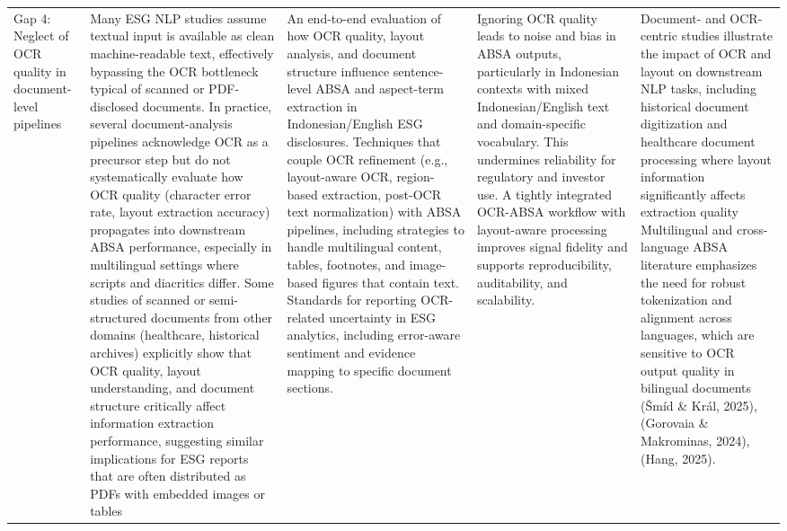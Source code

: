 \begin{landscape}
\begin{longtable}{p{2cm} p{8cm} p{7cm} p{4cm} p{4cm}}
Gap 4: Neglect of OCR quality in document-level pipelines & Many ESG NLP studies assume textual input is available as clean machine-readable text, effectively bypassing the OCR bottleneck typical of scanned or PDF-disclosed documents. In practice, several document-analysis pipelines acknowledge OCR as a precursor step but do not systematically evaluate how OCR quality (character error rate, layout extraction accuracy) propagates into downstream ABSA performance, especially in multilingual settings where scripts and diacritics differ. Some studies of scanned or semi-structured documents from other domains (healthcare, historical archives) explicitly show that OCR quality, layout understanding, and document structure critically affect information extraction performance, suggesting similar implications for ESG reports that are often distributed as PDFs with embedded images or tables \cite{10.1109/icdar.2011.302,10.1093/jamiaopen/ooac045,10.21203/rs.3.rs-6644838/v1,10.3390/app122111063} & An end-to-end evaluation of how OCR quality, layout analysis, and document structure influence sentence-level ABSA and aspect-term extraction in Indonesian/English ESG disclosures. Techniques that couple OCR refinement (e.g., layout-aware OCR, region-based extraction, post-OCR text normalization) with ABSA pipelines, including strategies to handle multilingual content, tables, footnotes, and image-based figures that contain text. Standards for reporting OCR-related uncertainty in ESG analytics, including error-aware sentiment and evidence mapping to specific document sections. & Ignoring OCR quality leads to noise and bias in ABSA outputs, particularly in Indonesian contexts with mixed Indonesian/English text and domain-specific vocabulary. This undermines reliability for regulatory and investor use. A tightly integrated OCR-ABSA workflow with layout-aware processing improves signal fidelity and supports reproducibility, auditability, and scalability. & Document- and OCR-centric studies illustrate the impact of OCR and layout on downstream NLP tasks, including historical document digitization and healthcare document processing where layout information significantly affects extraction quality \cite{10.1108/jd-03-2023-0055,10.1093/jamiaopen/ooac045,10.1109/icdar.2011.302,10.21203/rs.3.rs-6644838/v1,10.1145/3151509.3151525,10.1145/3167132.3167236,10.1145/3322905.3322909} Multilingual and cross-language ABSA literature emphasizes the need for robust tokenization and alignment across languages, which are sensitive to OCR output quality in bilingual documents (Šmíd \& Král, 2025), (Gorovaia \& Makrominas, 2024), (Hang, 2025). \\

\end{longtable}
\end{landscape}
